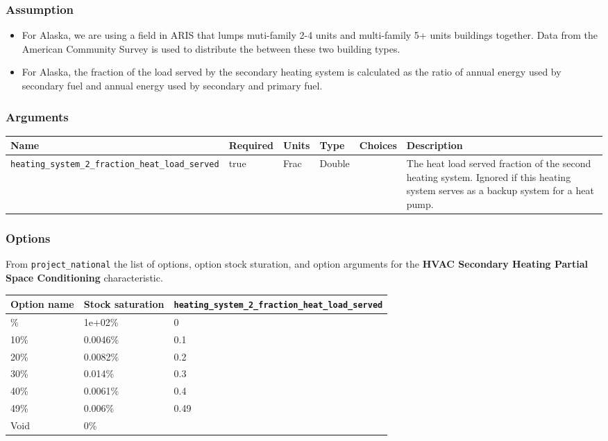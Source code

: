 \subsubsection{Assumption}\label{assumption-46}

\begin{itemize}
 
\item
  For Alaska, we are using a field in ARIS that lumps muti-family 2-4
  units and multi-family 5+ units buildings together. Data from the
  American Community Survey is used to distribute the between these two
  building types.
\item
  For Alaska, the fraction of the load served by the secondary heating
  system is calculated as the ratio of annual energy used by secondary
  fuel and annual energy used by secondary and primary fuel.
\end{itemize}

\subsubsection{Arguments}\label{arguments-48}

\begin{longtable}[]{@{}llllll@{}}
\toprule\noalign{}
Name & Required & Units & Type & Choices & Description \\
\midrule\noalign{}
\endhead
\bottomrule\noalign{}
\endlastfoot
\texttt{heating\_system\_2\_fraction\_heat\_load\_served} & true & Frac
& Double & & The heat load served fraction of the second heating system.
Ignored if this heating system serves as a backup system for a heat
pump. \\
\end{longtable}

\subsubsection{Options}\label{options-76}

From \texttt{project\_national} the list of options, option stock
sturation, and option arguments for the \textbf{HVAC Secondary Heating
Partial Space Conditioning} characteristic.

\begin{longtable}[]{@{}lll@{}}
\toprule\noalign{}
Option name & Stock saturation &
\texttt{heating\_system\_2\_fraction\_heat\_load\_served} \\
\midrule\noalign{}
\endhead
\bottomrule\noalign{}
\endlastfoot
0\% & 1e+02\% & 0 \\
10\% & 0.0046\% & 0.1 \\
20\% & 0.0082\% & 0.2 \\
30\% & 0.014\% & 0.3 \\
40\% & 0.0061\% & 0.4 \\
49\% & 0.006\% & 0.49 \\
Void & 0\% & \\
\end{longtable}


